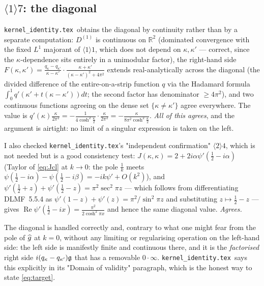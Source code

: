 \documentclass[11pt]{article}
\newcommand{\KI}{\texttt{kernel\_identity.tex}}\newcommand{\NOTE}{\texttt{universality\_normalization.tex}}
\begin{document}
\subsection{\(\langle1\rangle7\): the diagonal}

\KI\ obtains the diagonal by continuity rather than by a separate computation: \(D^{(1)}\) is
continuous on \(\mathbb R^2\) (dominated convergence with the fixed \(L^1\) majorant of
\(\langle1\rangle1\), which does not depend on \(\kappa,\kappa'\) --- correct, since the
\(\kappa\)-dependence sits entirely in a unimodular factor), the right-hand side
\(F(\kappa,\kappa')=\frac{q_\kappa-q_{\kappa'}}{\kappa-\kappa'}\cdot
\frac{\kappa+\kappa'}{(\kappa-\kappa')^2+4\pi^2}\) extends real-analytically across the diagonal
(the divided difference of the entire-on-a-strip function \(q\) via the Hadamard formula
\(\int_0^1q'(\kappa'+t(\kappa-\kappa'))dt\); the second factor has denominator \(\ge4\pi^2\)), and
two continuous functions agreeing on the dense set \(\{\kappa\neq\kappa'\}\) agree everywhere.
The value is \(q'(\kappa)\frac\kappa{2\pi^2}=-\frac1{4\cosh^2\frac\kappa2}\cdot\frac\kappa{2\pi^2}
=-\frac\kappa{8\pi^2\cosh^2\frac\kappa2}\).  \emph{All of this agrees}, and the argument is
airtight: no limit of a singular expression is taken on the left.

I also checked \KI's "independent confirmation" \(\langle2\rangle4\), which is not needed but is
a good consistency test: \(J(\kappa,\kappa)=2+2i\alpha\psi'(\frac12-i\alpha)\) (Taylor of
\eqref{eq:Jcl} at \(k\to0\): the pole \(\frac1k\) meets \(\psi(\frac12-i\alpha)-\psi(\frac12-i\beta)
=-ik\psi'+O(k^2)\)), and \(\psi'(\frac12+z)+\psi'(\frac12-z)=\pi^2\sec^2\pi z\) --- which follows
from differentiating DLMF~5.5.4 as \(\psi'(1-z)+\psi'(z)=\pi^2/\sin^2\pi z\) and substituting
\(z\mapsto\frac12-z\) --- gives \(\operatorname{Re}\psi'(\frac12-ix)=\frac{\pi^2}{2\cosh^2\pi x}\)
and hence the same diagonal value.  \emph{Agrees.}

\begin{verdictok}
The diagonal is handled correctly and, contrary to what one might fear from the pole of \(\widehat g\) at
\(k=0\), without any limiting or regularising operation on the left-hand side: the left side is
manifestly finite and continuous there, and it is the \emph{factorised} right side
\(i(q_\kappa-q_{\kappa'})\mathfrak g\) that has a removable \(0\cdot\infty\).  \KI\ says this explicitly
in its "Domain of validity" paragraph, which is the honest way to state \eqref{eq:target}.
\end{verdictok}
\end{document}
